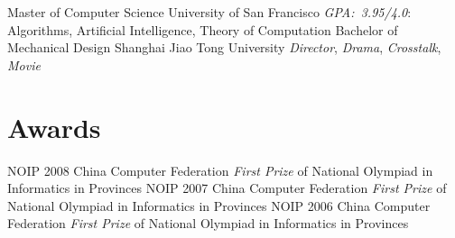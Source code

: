 \documentclass[]{friggeri-cv}
\begin{document}
\begin{entrylist}
  {Master \textnormal{of Computer Science}}
  {University of San Francisco}
  {
    \emph{GPA:~3.95/4.0}: Algorithms, Artificial Intelligence, Theory of Computation
  }
  {Bachelor \textnormal{of Mechanical Design}}
  {Shanghai Jiao Tong University}
  {
    \emph{Director}, \emph{Drama}, \emph{Crosstalk}, \emph{Movie}
  }
\end{entrylist}


\section{Awards}

\begin{entrylist}
  {NOIP 2008}
  {China Computer Federation}
  {\emph{First Prize} of National Olympiad in Informatics in Provinces}
  {NOIP 2007}
  {China Computer Federation}
  {\emph{First Prize} of National Olympiad in Informatics in Provinces}
  {NOIP 2006}
  {China Computer Federation}
  {\emph{First Prize} of National Olympiad in Informatics in Provinces}
\end{entrylist}
\end{document}
